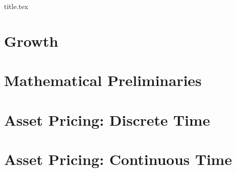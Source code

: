 \documentclass[12pt]{report}
\begin{document}
\hypersetup{pageanchor=false}
{title.tex}
\tableofcontents
\cleardoublepage
\hypersetup{pageanchor=true}

\chapter{Growth}




% 
% 
% 

% 

\chapter{Mathematical Preliminaries}



% 
% 
% 

\chapter{Asset Pricing: Discrete Time}


\chapter{Asset Pricing: Continuous Time}


\clearpage
\printbibliography
\end{document}
